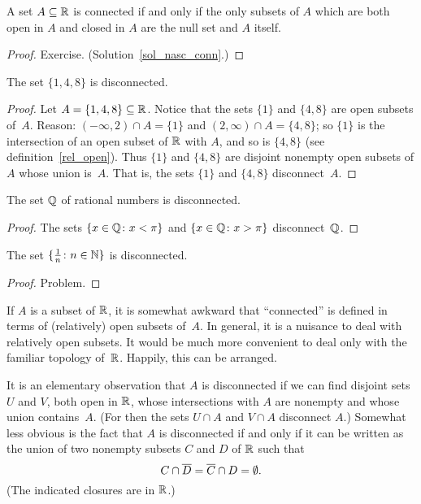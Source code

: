 \begin{prop}\label{prop_nasc_conn}  A set $A \subseteq \mathbb{R}$ is connected if and only if the
only subsets of $A$ which are both open in $A$ and closed in $A$ are the null set and $A$
itself.
\end{prop}

\begin{proof} Exercise. (Solution~\ref{sol_nasc_conn}.)  \ns  \end{proof}

\begin{exam} The set $\{1,4,8\}$ is disconnected.
\end{exam}

\begin{proof} Let $A = \{1,4,8\} \subseteq \mathbb{R}$.  Notice that the sets $\{1\}$ and $\{4,8\}$
are open subsets of~$A$.  Reason: $(-\infty, 2) \cap A = \{1\}$ and $(2,\infty) \cap A =
\{4,8\}$; so $\{1\}$ is the intersection of an open subset of $\mathbb{R}$ with $A$, and so is
$\{4,8\}$ (see definition~\ref{rel_open}). Thus $\{1\}$ and $\{4,8\}$ are disjoint nonempty
open subsets of $A$ whose union is~$A$.  That is, the sets $\{1\}$ and $\{4,8\}$
disconnect~$A$.
\end{proof}

\begin{exam} The set $\mathbb{Q}$ of rational numbers is disconnected.
\end{exam}

\begin{proof} The sets $\{x \in \mathbb{Q} \colon x < \pi\}$ and $\{x \in \mathbb{Q} \colon x > \pi\}$
disconnect~$\mathbb{Q}$.
\end{proof}

\begin{exam} The set $\{\frac1n \colon n \in \mathbb{N}\}$ is disconnected.
\end{exam}

\begin{proof} Problem.  \ns  \end{proof}

If $A$ is a subset of $\mathbb{R}$, it is somewhat awkward that ``connected'' is defined in terms of
(relatively) open subsets of~$A$.  In general, it is a nuisance to deal with relatively open
subsets.  It would be much more convenient to deal only with the familiar topology of~$\mathbb{R}$.
Happily, this can be arranged.

It is an elementary observation that $A$ is disconnected if we can find disjoint sets $U$ and
$V$, both open in $\mathbb{R}$, whose intersections with $A$ are nonempty and whose union
contains~$A$. (For then the sets $U \cap A$ and $V \cap A$ disconnect $A$.) Somewhat less
obvious is the fact that $A$ is disconnected if and only if it can be written as the union of
two nonempty subsets $C$ and $D$ of $\mathbb{R}$ such that
 \begin{equation}\label{eqn_mut_sep} C \cap \overline{D}  = \overline{C} \cap D
              = \emptyset.  \end{equation}
(The indicated closures are in $\mathbb{R}$.)

